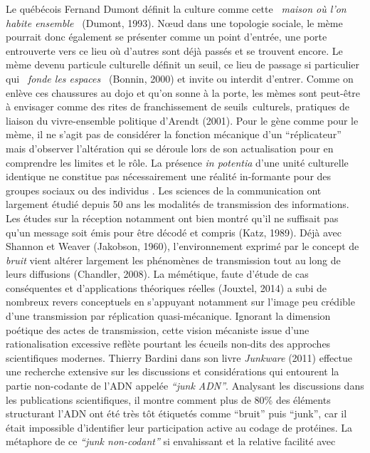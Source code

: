 Le qu\'eb\'ecois Fernand Dumont d\'efinit la culture comme cette \textit{{\guillemotleft}~maison o\`u l{\textquoteright}on habite ensemble~{\guillemotright} }(Dumont, 1993). N{\oe}ud dans une topologie sociale, le m\`eme pourrait donc \'egalement se pr\'esenter comme un point d{\textquoteright}entr\'ee, une porte entrouverte vers ce lieu o\`u d{\textquoteright}autres sont d\'ej\`a pass\'es et se trouvent encore. Le m\`eme devenu particule culturelle d\'efinit un seuil, ce lieu de passage si particulier qui \textit{{\guillemotleft}~fonde les espaces~{\guillemotright}} (Bonnin, 2000) et invite ou interdit d{\textquoteright}entrer. Comme on enl\`eve ces chaussures au dojo et qu{\textquoteright}on sonne \`a la porte, les m\`emes sont peut-\^etre \`a envisager comme des rites de franchissement de seuils~culturels, pratiques de liaison du vivre-ensemble politique d{\textquoteright}Arendt (2001). Pour le g\`ene comme pour le m\`eme, il ne s{\textquoteright}agit pas de consid\'erer la fonction m\'ecanique d{\textquoteright}un {\textquotedblleft}r\'eplicateur{\textquotedblright} mais d{\textquoteright}observer l{\textquoteright}alt\'eration qui se d\'eroule lors de son actualisation pour en comprendre les limites et le r\^ole. La pr\'esence \textit{in potentia }d{\textquoteright}une unit\'e culturelle identique ne constitue pas n\'ecessairement une r\'ealit\'e in-formante pour des groupes sociaux ou des individus \cite{Lissack2004}. Les sciences de la communication ont largement \'etudi\'e depuis 50 ans les modalit\'es de transmission des informations. Les \'etudes sur la r\'eception notamment ont bien montr\'e qu{\textquoteright}il ne suffisait pas qu{\textquoteright}un message soit \'emis pour \^etre d\'ecod\'e et compris (Katz, 1989). D\'ej\`a avec Shannon et Weaver (Jakobson, 1960), l{\textquoteright}environnement exprim\'e par le concept de\textit{ bruit }vient alt\'erer largement les ph\'enom\`enes de transmission tout au long de leurs diffusions (Chandler, 2008). La m\'em\'etique, faute d{\textquoteright}\'etude de cas cons\'equentes et d{\textquoteright}applications th\'eoriques r\'eelles (Jouxtel, 2014) a subi de nombreux revers conceptuels en s{\textquoteright}appuyant notamment sur l{\textquoteright}image peu cr\'edible d{\textquoteright}une transmission par r\'eplication quasi-m\'ecanique. Ignorant la dimension po\'etique des actes de transmission, cette vision m\'ecaniste issue d{\textquoteright}une rationalisation excessive refl\`ete pourtant les \'ecueils non-dits des approches scientifiques modernes. Thierry Bardini dans son livre \textit{Junkware }(2011) effectue une recherche extensive sur les discussions et consid\'erations qui entourent la partie non-codante de l{\textquoteright}ADN appel\'ee \textit{{\textquotedblleft}junk ADN{\textquotedblright}}. Analysant les discussions dans les publications scientifiques, il montre comment plus de 80\% des \'el\'ements structurant l{\textquoteright}ADN ont \'et\'e tr\`es t\^ot \'etiquet\'es comme {\textquotedblleft}bruit{\textquotedblright} puis {\textquotedblleft}junk{\textquotedblright}, car il \'etait impossible d{\textquoteright}identifier leur participation active au codage de prot\'eines. La m\'etaphore de ce \textit{{\textquotedblleft}junk non-codant{\textquotedblright} }si envahissant et la relative facilit\'e avec 